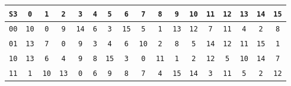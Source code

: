 \documentclass{article}
\begin{document}
\begin{center}
\vspace{10pt}
\begin{tabular}{|c|cccccccccccccccc|}
  \hline
\texttt{S3} & \texttt{0} & \texttt{1} & \texttt{2} & \texttt{3} & \texttt{4} & \texttt{5} & \texttt{6} & \texttt{7} & \texttt{8} & \texttt{9} & \texttt{10} & \texttt{11} & \texttt{12} & \texttt{13} & \texttt{14} & \texttt{15} \\
\hline
\texttt{0}\texttt{0} & \texttt{1}\texttt{0} & \texttt{0} & \texttt{9} & \texttt{1}\texttt{4} & \texttt{6} & \texttt{3} & \texttt{1}\texttt{5} & \texttt{5} & \texttt{1} & \texttt{1}\texttt{3} & \texttt{1}\texttt{2} & \texttt{7} & \texttt{1}\texttt{1} & \texttt{4} & \texttt{2} & \texttt{8} \\
\texttt{0}\texttt{1} & \texttt{1}\texttt{3} & \texttt{7} & \texttt{0} & \texttt{9} & \texttt{3} & \texttt{4} & \texttt{6} & \texttt{1}\texttt{0} & \texttt{2} & \texttt{8} & \texttt{5} & \texttt{1}\texttt{4} & \texttt{1}\texttt{2} & \texttt{1}\texttt{1} & \texttt{1}\texttt{5} & \texttt{1} \\
\texttt{1}\texttt{0} & \texttt{1}\texttt{3} & \texttt{6} & \texttt{4} & \texttt{9} & \texttt{8} & \texttt{1}\texttt{5} & \texttt{3} & \texttt{0} & \texttt{1}\texttt{1} & \texttt{1} & \texttt{2} & \texttt{1}\texttt{2} & \texttt{5} & \texttt{1}\texttt{0} & \texttt{1}\texttt{4} & \texttt{7} \\
\texttt{1}\texttt{1} & \texttt{1} & \texttt{1}\texttt{0} & \texttt{1}\texttt{3} & \texttt{0} & \texttt{6} & \texttt{9} & \texttt{8} & \texttt{7} & \texttt{4} & \texttt{1}\texttt{5} & \texttt{1}\texttt{4} & \texttt{3} & \texttt{1}\texttt{1} & \texttt{5} & \texttt{2} & \texttt{1}\texttt{2}  \\
\hline
\end{tabular}



\end{center}
\end{document}
